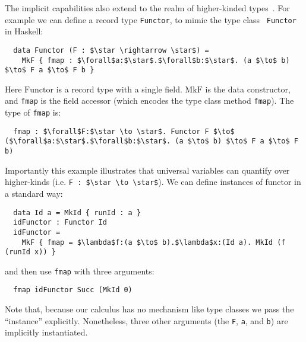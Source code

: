 The implicit capabilities also extend to the realm of higher-kinded types~\citep{tapl}.
For example we can define a record type \lstinline{Functor},
to mimic the type class~\citep{typeclasseswadler,typeclasseskaes} \lstinline{Functor} in Haskell:
\newcommand{\Functor}[0]{\mathrm{Functor}}
\newcommand{\MkFunctor}[0]{\mathrm{MkF}}
\newcommand{\Id}[0]{\mathrm{Id}}
\newcommand{\MkId}[0]{\mathrm{MkId}}
\newcommand{\fmap}[0]{fmap}
\begin{lstlisting}
  data Functor (F : $\star \rightarrow \star$) =
    MkF { fmap : $\forall$a:$\star$.$\forall$b:$\star$. (a $\to$ b) $\to$ F a $\to$ F b }
\end{lstlisting}
\noindent Here $\Functor$ is a record type with a single field. $\MkFunctor$ is the data constructor,
and \lstinline{fmap} is the field accessor (which encodes the type class method \lstinline{fmap}).
The type of \lstinline{fmap} is:
\begin{lstlisting}
  fmap : $\forall$F:$\star \to \star$. Functor F $\to$ ($\forall$a:$\star$.$\forall$b:$\star$. (a $\to$ b) $\to$ F a $\to$ F b)
\end{lstlisting}
Importantly this example illustrates that universal variables can quantify over higher-kinds (i.e.
\lstinline{F : $\star \to \star$}).
We can define instances of functor in a standard way:
\begin{lstlisting}
  data Id a = MkId { runId : a }
  idFunctor : Functor Id
  idFunctor =
    MkF { fmap = $\lambda$f:(a $\to$ b).$\lambda$x:(Id a). MkId (f (runId x)) }
\end{lstlisting}
and then use \lstinline{fmap} with three arguments:
\begin{lstlisting}
  fmap idFunctor Succ (MkId 0)
\end{lstlisting}
\noindent Note that, because our calculus has no mechanism like type classes we pass the ``instance'' explicitly.
Nonetheless, three other arguments (the \lstinline{F}, \lstinline{a}, and \lstinline{b}) are implicitly instantiated.

